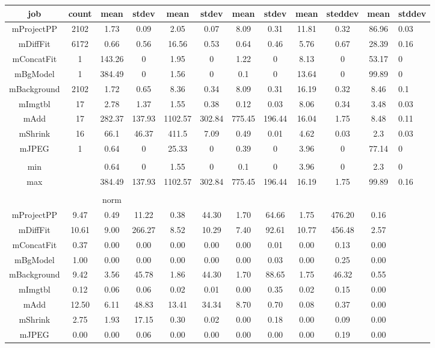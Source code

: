 \begin{table}[htb]
    \centering
    \begin{tabular}{@{}ccccccccccc@{}}
        \toprule
        job & count & mean & stdev & mean & stdev & mean & stdev & mean & steddev & mean & stddev \\
        \midrule
        mProjectPP & 2102 & 1.73 & 0.09 & 2.05 & 0.07 & 8.09 & 0.31 & 11.81 & 0.32 & 86.96 & 0.03 \\
        mDiffFit & 6172 & 0.66 & 0.56 & 16.56 & 0.53 & 0.64 & 0.46 & 5.76 & 0.67 & 28.39 & 0.16 \\
        mConcatFit & 1 & 143.26 & 0 & 1.95 & 0 & 1.22 & 0 & 8.13 & 0 & 53.17 & 0 \\
        mBgModel & 1 & 384.49 & 0 & 1.56 & 0 & 0.1 & 0 & 13.64 & 0 & 99.89 & 0 \\
        mBackground & 2102 & 1.72 & 0.65 & 8.36 & 0.34 & 8.09 & 0.31 & 16.19 & 0.32 & 8.46 & 0.1 \\
        mImgtbl & 17 & 2.78 & 1.37 & 1.55 & 0.38 & 0.12 & 0.03 & 8.06 & 0.34 & 3.48 & 0.03 \\
        mAdd & 17 & 282.37 & 137.93 & 1102.57 & 302.84 & 775.45 & 196.44 & 16.04 & 1.75 & 8.48 & 0.11 \\
        mShrink & 16 & 66.1 & 46.37 & 411.5 & 7.09 & 0.49 & 0.01 & 4.62 & 0.03 & 2.3 & 0.03 \\
        mJPEG & 1 & 0.64 & 0 & 25.33 & 0 & 0.39 & 0 & 3.96 & 0 & 77.14 & 0 \\
         &  &  &  &  &  &  &  &  &  &  &  \\
        min &  & 0.64 & 0 & 1.55 & 0 & 0.1 & 0 & 3.96 & 0 & 2.3 & 0 \\
        max &  & 384.49 & 137.93 & 1102.57 & 302.84 & 775.45 & 196.44 & 16.19 & 1.75 & 99.89 & 0.16 \\
         &  &  &  &  &  &  &  &  &  &  &  \\
         &  & norm &  &  &  &  &  &  &  &  &  \\
        mProjectPP & 9.47 & 0.49 & 11.22 & 0.38 & 44.30 & 1.70 & 64.66 & 1.75 & 476.20 & 0.16 \\
        mDiffFit & 10.61 & 9.00 & 266.27 & 8.52 & 10.29 & 7.40 & 92.61 & 10.77 & 456.48 & 2.57 \\
        mConcatFit & 0.37 & 0.00 & 0.00 & 0.00 & 0.00 & 0.00 & 0.01 & 0.00 & 0.13 & 0.00 \\
        mBgModel & 1.00 & 0.00 & 0.00 & 0.00 & 0.00 & 0.00 & 0.03 & 0.00 & 0.25 & 0.00 \\
        mBackground & 9.42 & 3.56 & 45.78 & 1.86 & 44.30 & 1.70 & 88.65 & 1.75 & 46.32 & 0.55 \\
        mImgtbl & 0.12 & 0.06 & 0.06 & 0.02 & 0.01 & 0.00 & 0.35 & 0.02 & 0.15 & 0.00 \\
        mAdd & 12.50 & 6.11 & 48.83 & 13.41 & 34.34 & 8.70 & 0.70 & 0.08 & 0.37 & 0.00 \\
        mShrink & 2.75 & 1.93 & 17.15 & 0.30 & 0.02 & 0.00 & 0.18 & 0.00 & 0.09 & 0.00 \\
        mJPEG & 0.00 & 0.00 & 0.06 & 0.00 & 0.00 & 0.00 & 0.00 & 0.00 & 0.19 & 0.00 \\
        \bottomrule
    \end{tabular}
\end{table}
